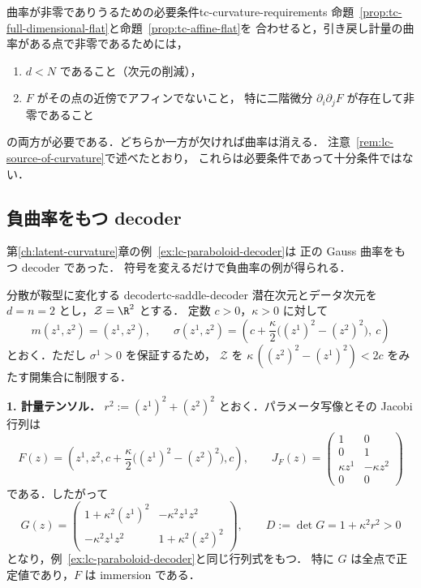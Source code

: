 \begin{remark}{曲率が非零でありうるための必要条件}{tc-curvature-requirements}
  命題~\ref{prop:tc-full-dimensional-flat}と命題~\ref{prop:tc-affine-flat}を
  合わせると，引き戻し計量の曲率がある点で非零であるためには，
  \begin{enumerate}
    \item $d<N$ であること（次元の削減），
    \item $F$ がその点の近傍でアフィンでないこと，
      特に二階微分 $\partial_i\partial_jF$ が存在して非零であること
  \end{enumerate}
  の両方が必要である．どちらか一方が欠ければ曲率は消える．
  注意~\ref{rem:lc-source-of-curvature}で述べたとおり，
  これらは必要条件であって十分条件ではない．
\end{remark}

\subsection{負曲率をもつ decoder}

第\ref{ch:latent-curvature}章の例~\ref{ex:lc-paraboloid-decoder}は
正の Gauss 曲率をもつ decoder であった．
符号を変えるだけで負曲率の例が得られる．

\begin{example}{分散が鞍型に変化する decoder}{tc-saddle-decoder}
  潜在次元とデータ次元を $d=n=2$ とし，$\mathcal{Z}=\R^2$ とする．
  定数 $c>0$，$\kappa>0$ に対して
  \[
    m(z^1,z^2)=(z^1,z^2),
    \qquad
    \sigma(z^1,z^2)
    =\left(
      c+\frac{\kappa}{2}\bigl((z^1)^2-(z^2)^2\bigr),\ c
    \right)
  \]
  とおく．ただし $\sigma^1>0$ を保証するため，
  $\mathcal{Z}$ を $\kappa\,((z^2)^2-(z^1)^2)<2c$ をみたす開集合に制限する．
\end{example}

\textbf{1. 計量テンソル．}
$r^2:=(z^1)^2+(z^2)^2$ とおく．パラメータ写像とその Jacobi 行列は
\[
  F(z)=\left(z^1,z^2,c+\frac{\kappa}{2}\bigl((z^1)^2-(z^2)^2\bigr),c\right),
  \qquad
  J_F(z)=
  \begin{pmatrix}
    1&0\\
    0&1\\
    \kappa z^1&-\kappa z^2\\
    0&0
  \end{pmatrix}
\]
である．したがって
\[
  G(z)
  =\begin{pmatrix}
    1+\kappa^2(z^1)^2&-\kappa^2z^1z^2\\
    -\kappa^2z^1z^2&1+\kappa^2(z^2)^2
  \end{pmatrix},
  \qquad
  D:=\det G=1+\kappa^2r^2>0
\]
となり，例~\ref{ex:lc-paraboloid-decoder}と同じ行列式をもつ．
特に $G$ は全点で正定値であり，$F$ は immersion である．

